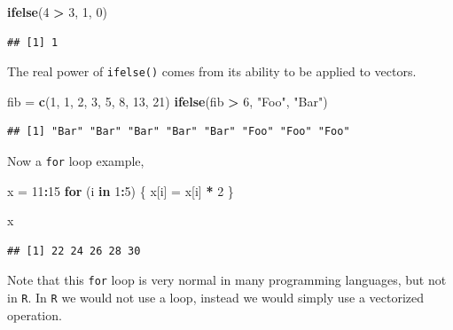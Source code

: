 \documentclass[]{book}
\newenvironment{Shaded}{\begin{snugshade}}{\end{snugshade}}
\newcommand{\KeywordTok}[1]{\textcolor[rgb]{0.13,0.29,0.53}{\textbf{#1}}}
\newcommand{\DecValTok}[1]{\textcolor[rgb]{0.00,0.00,0.81}{#1}}
\newcommand{\StringTok}[1]{\textcolor[rgb]{0.31,0.60,0.02}{#1}}
\newcommand{\ControlFlowTok}[1]{\textcolor[rgb]{0.13,0.29,0.53}{\textbf{#1}}}
\newcommand{\OperatorTok}[1]{\textcolor[rgb]{0.81,0.36,0.00}{\textbf{#1}}}
\newcommand{\NormalTok}[1]{#1}
\theoremstyle{definition}
\theoremstyle{definition}
\theoremstyle{definition}
\theoremstyle{remark}
\begin{document}
\begin{Shaded}
\begin{Highlighting}[]
\KeywordTok{ifelse}\NormalTok{(}\DecValTok{4} \OperatorTok{>}\StringTok{ }\DecValTok{3}\NormalTok{, }\DecValTok{1}\NormalTok{, }\DecValTok{0}\NormalTok{)}
\end{Highlighting}
\end{Shaded}

\begin{verbatim}
## [1] 1
\end{verbatim}

The real power of \texttt{ifelse()} comes from its ability to be applied
to vectors.

\begin{Shaded}
\begin{Highlighting}[]
\NormalTok{fib =}\StringTok{ }\KeywordTok{c}\NormalTok{(}\DecValTok{1}\NormalTok{, }\DecValTok{1}\NormalTok{, }\DecValTok{2}\NormalTok{, }\DecValTok{3}\NormalTok{, }\DecValTok{5}\NormalTok{, }\DecValTok{8}\NormalTok{, }\DecValTok{13}\NormalTok{, }\DecValTok{21}\NormalTok{)}
\KeywordTok{ifelse}\NormalTok{(fib }\OperatorTok{>}\StringTok{ }\DecValTok{6}\NormalTok{, }\StringTok{"Foo"}\NormalTok{, }\StringTok{"Bar"}\NormalTok{)}
\end{Highlighting}
\end{Shaded}

\begin{verbatim}
## [1] "Bar" "Bar" "Bar" "Bar" "Bar" "Foo" "Foo" "Foo"
\end{verbatim}

Now a \texttt{for} loop example,

\begin{Shaded}
\begin{Highlighting}[]
\NormalTok{x =}\StringTok{ }\DecValTok{11}\OperatorTok{:}\DecValTok{15}
\ControlFlowTok{for}\NormalTok{ (i }\ControlFlowTok{in} \DecValTok{1}\OperatorTok{:}\DecValTok{5}\NormalTok{) \{}
\NormalTok{  x[i] =}\StringTok{ }\NormalTok{x[i] }\OperatorTok{*}\StringTok{ }\DecValTok{2}
\NormalTok{\}}

\NormalTok{x}
\end{Highlighting}
\end{Shaded}

\begin{verbatim}
## [1] 22 24 26 28 30
\end{verbatim}

Note that this \texttt{for} loop is very normal in many programming
languages, but not in \texttt{R}. In \texttt{R} we would not use a loop,
instead we would simply use a vectorized operation.
\end{document}
